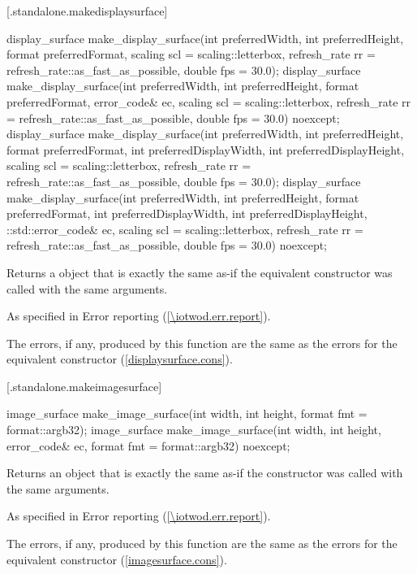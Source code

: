  [\iotwod.standalone.makedisplaysurface] {}

\begin{itemdecl}
display_surface make_display_surface(int preferredWidth,
  int preferredHeight, format preferredFormat,
  scaling scl = scaling::letterbox,
  refresh_rate rr = refresh_rate::as_fast_as_possible, double fps = 30.0);
display_surface make_display_surface(int preferredWidth,
  int preferredHeight, format preferredFormat, error_code& ec,
  scaling scl = scaling::letterbox,
  refresh_rate rr = refresh_rate::as_fast_as_possible, double fps = 30.0) 
  noexcept;
display_surface make_display_surface(int preferredWidth,
  int preferredHeight, format preferredFormat, int preferredDisplayWidth, 
  int preferredDisplayHeight, scaling scl = scaling::letterbox,
  refresh_rate rr = refresh_rate::as_fast_as_possible, double fps = 30.0);
display_surface make_display_surface(int preferredWidth,
  int preferredHeight, format preferredFormat, int preferredDisplayWidth, 
  int preferredDisplayHeight, ::std::error_code& ec,
  scaling scl = scaling::letterbox,
  refresh_rate rr = refresh_rate::as_fast_as_possible, double fps = 30.0) 
  noexcept;
\end{itemdecl}
\begin{itemdescr}
\pnum
\returns
Returns a  object that is exactly the same as-if the equivalent  constructor was called with the same arguments.

\pnum
\throws
As specified in Error reporting (\ref{\iotwod.err.report}).

\pnum
\errors
The errors, if any, produced by this function are the same as the errors for the equivalent  constructor (\ref{displaysurface.cons}).
\end{itemdescr}

 [\iotwod.standalone.makeimagesurface] {}

\begin{itemdecl}
image_surface make_image_surface(int width, int height,
  format fmt = format::argb32);
image_surface make_image_surface(int width, int height,
  error_code& ec, format fmt = format::argb32) noexcept;
\end{itemdecl}
\begin{itemdescr}
\pnum
\returns
Returns an  object that is exactly the same as-if the  constructor was called with the same arguments.

\pnum
\throws
As specified in Error reporting (\ref{\iotwod.err.report}).

\pnum
\errors
The errors, if any, produced by this function are the same as the errors for the equivalent  constructor (\ref{imagesurface.cons}).
\end{itemdescr}
